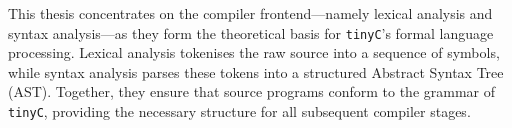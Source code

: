 This thesis concentrates on the compiler frontend—namely lexical analysis and syntax analysis—as they form the theoretical basis for \texttt{tinyC}’s formal language processing. Lexical analysis tokenises the raw source into a sequence of symbols, while syntax analysis parses these tokens into a structured Abstract Syntax Tree (AST). Together, they ensure that source programs conform to the grammar of \texttt{tinyC}, providing the necessary structure for all subsequent compiler stages.


\pagebreak
